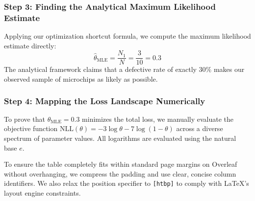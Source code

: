 \documentclass{article}
\begin{document}
\subsubsection{Step 3: Finding the Analytical Maximum Likelihood Estimate}
Applying our optimization shortcut formula, we compute the maximum likelihood estimate directly:
\begin{equation}
\hat{\theta}_{\text{MLE}} = \frac{N_1}{N} = \frac{3}{10} = \mathbf{0.3}
\end{equation}
The analytical framework claims that a defective rate of exactly $30\%$ makes our observed sample of microchips as likely as possible.

\subsubsection{Step 4: Mapping the Loss Landscape Numerically}

To prove that $\hat{\theta}_{\text{MLE}} = 0.3$ minimizes the total loss, we manually evaluate the objective function $\text{NLL}(\theta) = -3 \log \theta - 7 \log(1 - \theta)$ across a diverse spectrum of parameter values. All logarithms are evaluated using the natural base $e$.

To ensure the table completely fits within standard page margins on Overleaf without overhanging, we compress the padding and use clear, concise column identifiers. We also relax the position specifier to \texttt{[htbp]} to comply with \LaTeX{}'s layout engine constraints.

\begin{table}[htbp]
\centering
\small
\setlength{\tabcolsep}{6pt}
\caption{Loss Landscape Values for the Defective Microchip Dataset}
\label{tab:bernoulli_loss}
\end{table}
\end{document}
